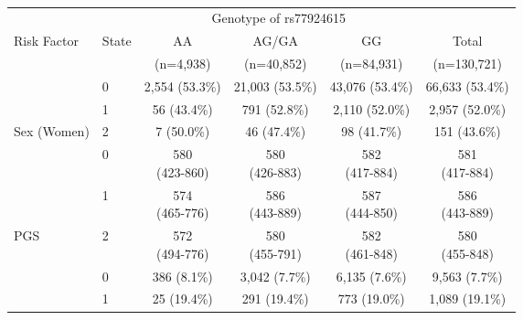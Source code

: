 \begin{table}[!ht]
\footnotesize
\caption{\captionukbriskfactordistributions}
\label{tab:ukb-risk-factor-distributions}
\centering
\begin{tabular}[t]{llcccc}
\toprule
& & \multicolumn{3}{c}{Genotype of rs77924615} & \\
\cmidrule(lr){3-5}
Risk Factor & State & AA & AG/GA & GG & Total \\ & & (n=4,938) & (n=40,852) & (n=84,931) & (n=130,721) \\
\midrule
\cellcolor{gray!10} & \cellcolor{gray!10}0 & \cellcolor{gray!10}2,554 (53.3\%) & \cellcolor{gray!10}21,003 (53.5\%) & \cellcolor{gray!10}43,076 (53.4\%) & \cellcolor{gray!10}66,633 (53.4\%) \\
\cellcolor{gray!10} & \cellcolor{gray!10}1 & \cellcolor{gray!10}56 (43.4\%) & \cellcolor{gray!10}791 (52.8\%) & \cellcolor{gray!10}2,110 (52.0\%) & \cellcolor{gray!10}2,957 (52.0\%) \\
\multirow{-3}{*}{\cellcolor{gray!10}Sex (Women)} & \cellcolor{gray!10}2 & \cellcolor{gray!10}7 (50.0\%) & \cellcolor{gray!10}46 (47.4\%) & \cellcolor{gray!10}98 (41.7\%) & \cellcolor{gray!10}151 (43.6\%) \\
 & 0 & \makecell{580 \\ (423-860)} & \makecell{580 \\ (426-883)} & \makecell{582 \\ (417-884)} & \makecell{581 \\ (417-884)} \\
 & 1 & \makecell{574 \\ (465-776)} & \makecell{586 \\ (443-889)} & \makecell{587 \\ (444-850)} & \makecell{586 \\ (443-889)} \\
\multirow{-3}{*}{PGS} & 2 & \makecell{572 \\ (494-776)} & \makecell{580 \\ (455-791)} & \makecell{582 \\ (461-848)} & \makecell{580 \\ (455-848)} \\
\cellcolor{gray!10} & \cellcolor{gray!10}0 & \cellcolor{gray!10}386 (8.1\%) & \cellcolor{gray!10}3,042 (7.7\%) & \cellcolor{gray!10}6,135 (7.6\%) & \cellcolor{gray!10}9,563 (7.7\%) \\
\cellcolor{gray!10} & \cellcolor{gray!10}1 & \cellcolor{gray!10}25 (19.4\%) & \cellcolor{gray!10}291 (19.4\%) & \cellcolor{gray!10}773 (19.0\%) & \cellcolor{gray!10}1,089 (19.1\%) \\

\end{tabular}
\end{table}
